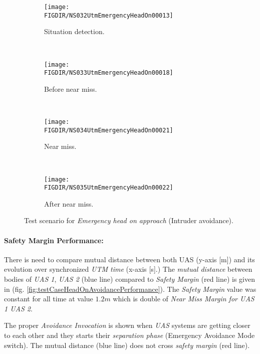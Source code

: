 \begin{figure}[H]
    \centering
    \begin{subfigure}{0.75\textwidth}
        \centering
        \texttt{[image: \\FIGDIR/NS032UtmEmergencyHeadOn00013]}
        \caption{Situation detection.}
        \label{fig:emergencyHeadOnSituationDetection}
    \end{subfigure}
    \\
    \begin{subfigure}{0.75\textwidth}
        \centering
        \texttt{[image: \\FIGDIR/NS033UtmEmergencyHeadOn00018]} 
        \caption{Before near miss.}
        \label{fig:emergencyHeadOnBeforeNearMiss}
    \end{subfigure}
    \\
    \begin{subfigure}{0.75\textwidth}
        \centering
        \texttt{[image: \\FIGDIR/NS034UtmEmergencyHeadOn00021]} 
        \caption{Near miss.}
        \label{fig:emergencyHeadOnNearMiss}
    \end{subfigure}
    \\
    \begin{subfigure}{0.75\textwidth}
        \centering
        \texttt{[image: \\FIGDIR/NS035UtmEmergencyHeadOn00022]} 
        \caption{After near miss.}
        \label{fig:emergencyHeadOnAfterNearMiss}
    \end{subfigure}
    \caption{Test scenario for \emph{Emergency head on approach} (Intruder avoidance). }
    \label{fig:testCaseEmergencyHeadOnApproach}
\end{figure}


\paragraph{Safety Margin Performance:} There is need to compare mutual distance between both UAS (y-axis [m]) and its evolution over synchronized \emph{UTM time} (x-axis [s].) The \emph{mutual distance} between bodies of \emph{UAS 1}, \emph{UAS 2} (blue line) compared to \emph{Safety Margin} (red line) is given in (fig. \ref{fig:testCaseHeadOnAvoidancePerformance}). The \emph{Safety Margin} value was constant for all time at value $1.2m$ which is double of \emph{Near Miss Margin for UAS 1 UAS 2}.

The proper \emph{Avoidance Invocation} is shown when \emph{UAS} systems are getting closer to each other and they starts their \emph{separation phase} (Emergency Avoidance Mode switch). The mutual distance (blue line) does not cross \emph{safety margin} (red line).

